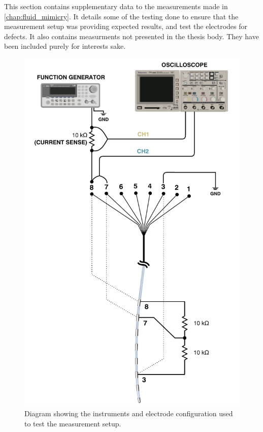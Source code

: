 This section contains supplementary data to the measurements made in \cref{chap:fluid_mimicry}.
It details some of the testing done to ensure that the measurement setup was providing expected results, and test the electrodes for defects.
It also contains measurments not presented in the thesis body.
They have been included purely for interests sake.


\begin{figure}
    \centering
    \includegraphics[scale=0.95]{content/appendices/Solution-Impedance-Measurements/graphics/Solution-Impedance-Testing-Setup}
    \caption{\label{fig:solution_impedance_testing_setup}Diagram showing the instruments and electrode configuration used to test the measurement setup.}
\end{figure}

